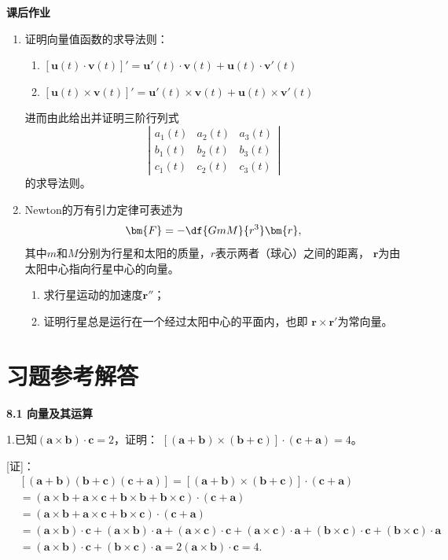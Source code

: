\begin{ext}
	{\bf 课后作业}
	\begin{enumerate}
	  \item 证明向量值函数的求导法则：
	  \begin{enumerate}[(1)]
	    \item $[\bm{u}(t)\cdot\bm{v}(t)]'
	    =\bm{u}'(t)\cdot\bm{v}(t)+\bm{u}(t)\cdot\bm{v}'(t)$
	    \item $[\bm{u}(t)\times\bm{v}(t)]'
	    =\bm{u}'(t)\times\bm{v}(t)+\bm{u}(t)\times\bm{v}'(t)$ 
	  \end{enumerate}
	  进而由此给出并证明三阶行列式
	  $$\left|\begin{array}{ccc}
	  	a_1(t) & a_2(t) & a_3(t)\\
	  	b_1(t) & b_2(t) & b_3(t)\\
	  	c_1(t) & c_2(t) & c_3(t)
	  \end{array}\right|$$
	  的求导法则。	  
	  \item Newton的万有引力定律可表述为
	  $$\bm{F}=-\df{GmM}{r^3}\bm{r},$$
	  其中$m$和$M$分别为行星和太阳的质量，$r$表示两者（球心）之间的距离，
	  $\bm{r}$为由太阳中心指向行星中心的向量。
	  \begin{enumerate}[(1)]
	    \item 求行星运动的加速度$\bm{r}''$；
	    \item 证明行星总是运行在一个经过太阳中心的平面内，也即
	    $\bm{r}\times\bm{r}'$为常向量。
	  \end{enumerate}
	\end{enumerate}
\end{ext}

\newpage

\section*{习题参考解答}

\begin{center}
	\bf 8.1 向量及其运算
\end{center}

1.已知$(\bm{a}\times\bm{b})\cdot\bm{c}=2$，证明：
$[(\bm{a}+\bm{b})\times(\bm{b}+\bm{c})]\cdot(\bm{c}+\bm{a})=4$。

[证]：
\begin{align*}
	&[(\bm{a}+\bm{b})(\bm{b}+\bm{c})(\bm{c}+\bm{a})]
	=[(\bm{a}+\bm{b})\times(\bm{b}+\bm{c})]\cdot(\bm{c}+\bm{a})\\
	&=(\bm{a}\times\bm{b}+\bm{a}\times\bm{c}
	+\bm{b}\times\bm{b}+\bm{b}\times\bm{c})\cdot(\bm{c}+\bm{a})\\
	&=(\bm{a}\times\bm{b}+\bm{a}\times\bm{c}
	+\bm{b}\times\bm{c})\cdot(\bm{c}+\bm{a})\\
	&=(\bm{a}\times\bm{b})\cdot\bm{c}+(\bm{a}\times\bm{b})\cdot\bm{a}
	+(\bm{a}\times\bm{c})\cdot\bm{c}+(\bm{a}\times\bm{c})\cdot\bm{a}
	+(\bm{b}\times\bm{c})\cdot\bm{c}+(\bm{b}\times\bm{c})\cdot\bm{a}\\
	&=(\bm{a}\times\bm{b})\cdot\bm{c}+(\bm{b}\times\bm{c})\cdot\bm{a}
	=2(\bm{a}\times\bm{b})\cdot\bm{c}=4.
\end{align*}
\fin

